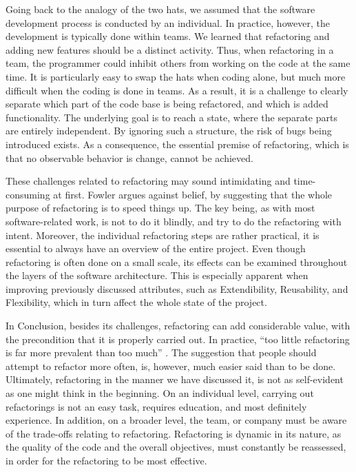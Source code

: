 Going back to the analogy of the two hats, 
	we assumed that the software development process 
	is conducted by an individual. 
In practice, however, 
	the development is typically done within teams. 
We learned that refactoring and adding new features 
	should be a distinct activity. 
Thus, when refactoring in a team,
	the programmer could inhibit others from working on the code 
	at the same time. 
It is particularly easy to swap the hats when coding alone, 
	but much more difficult when the coding is done in teams. 
As a result, 
	it is a challenge to clearly separate 
	which part of the code base is being refactored, 
	and which is added functionality. 
The underlying goal is to reach a state,
	where the separate parts are entirely independent. 
By ignoring such a structure, 
	the risk of bugs being introduced exists. 
As a consequence, 
	the essential premise of refactoring, 
	which is that no observable behavior is change, 
	cannot be achieved.

These challenges related to refactoring 
	may sound intimidating and time-consuming at first.
Fowler \textcite[p.~56]{fowler2018} argues against belief,
	by suggesting that the whole purpose of refactoring 
	is to speed things up.
The key being, as with most software-related work, is not to do it blindly, 
	and try to do the refactoring with intent.
Moreover, the individual refactoring steps are rather practical,
	it is essential to always have an overview of the entire project.
Even though refactoring is often done on a small scale,
	its effects can be examined 
	throughout the layers of the software architecture.
This is especially apparent when improving previously discussed attributes,
	such as Extendibility, Reusability, and Flexibility, 
	which in turn affect the whole state of the project. 

	
In Conclusion, besides its challenges, 
	refactoring can add considerable value, 
	with the precondition that it is properly carried out.
In practice, 
	“too little refactoring is far more prevalent than too much” 
	\cite[p.56]{fowler2018}.
The suggestion that people should attempt to refactor more often, 
	is, however, much easier said than to be done.
Ultimately, refactoring in the manner we have discussed it, 
	is not as self-evident as one might think in the beginning.
On an individual level, carrying out refactorings is not an easy task, 
	requires education, and most definitely experience.
In addition, on a broader level, the team, or company must be aware of the trade-offs relating to refactoring. 
Refactoring is dynamic in its nature,
	as the quality of the code and the overall objectives,
	must constantly be reassessed,
	in order for the refactoring to be most effective.

